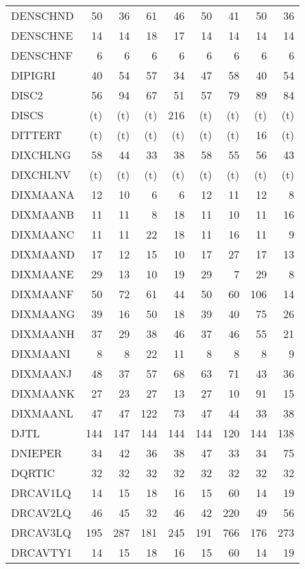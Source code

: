 \documentclass[11pt,twoside]{article}
\begin{document}
{\begin{longtable}[c]{|l|r|r|r|r|r|r|r|r|}
 DENSCHND & 50 & 36 & 61 & 46 & 50 & 41 & 50 & 36 \\
 DENSCHNE & 14 & 14 & 18 & 17 & 14 & 14 & 14 & 14 \\
 DENSCHNF & 6 & 6 & 6 & 6 & 6 & 6 & 6 & 6 \\
 DIPIGRI & 40 & 54 & 57 & 34 & 47 & 58 & 40 & 54 \\
 DISC2 & 56 & 94 & 67 & 51 & 57 & 79 & 89 & 84 \\
 DISCS & (t) & (t) & (t) & 216 & (t) & (t) & (t) & (t) \\
 DITTERT & (t) & (t) & (t) & (t) & (t) & (t) & 16 & (t) \\
 DIXCHLNG & 58 & 44 & 33 & 38 & 58 & 55 & 56 & 43 \\
 DIXCHLNV & (t) & (t) & (t) & (t) & (t) & (t) & (t) & (t) \\
 DIXMAANA & 12 & 10 & 6 & 6 & 12 & 11 & 12 & 8 \\
 DIXMAANB & 11 & 11 & 8 & 18 & 11 & 10 & 11 & 16 \\
 DIXMAANC & 11 & 11 & 22 & 18 & 11 & 16 & 11 & 9 \\
 DIXMAAND & 17 & 12 & 15 & 10 & 17 & 27 & 17 & 13 \\
 DIXMAANE & 29 & 13 & 10 & 19 & 29 & 7 & 29 & 8 \\
 DIXMAANF & 50 & 72 & 61 & 44 & 50 & 60 & 106 & 14 \\
 DIXMAANG & 39 & 16 & 50 & 18 & 39 & 40 & 75 & 26 \\
 DIXMAANH & 37 & 29 & 38 & 46 & 37 & 46 & 55 & 21 \\
 DIXMAANI & 8 & 8 & 22 & 11 & 8 & 8 & 8 & 9 \\
 DIXMAANJ & 48 & 37 & 57 & 68 & 63 & 71 & 43 & 36 \\
 DIXMAANK & 27 & 23 & 27 & 13 & 27 & 10 & 91 & 15 \\
 DIXMAANL & 47 & 47 & 122 & 73 & 47 & 44 & 33 & 38 \\
 DJTL & 144 & 147 & 144 & 144 & 144 & 120 & 144 & 138 \\
 DNIEPER & 34 & 42 & 36 & 38 & 47 & 33 & 34 & 75 \\
 DQRTIC & 32 & 32 & 32 & 32 & 32 & 32 & 32 & 32 \\
 DRCAV1LQ & 14 & 15 & 18 & 16 & 15 & 60 & 14 & 19 \\
 DRCAV2LQ & 46 & 45 & 32 & 46 & 42 & 220 & 49 & 56 \\
 DRCAV3LQ & 195 & 287 & 181 & 245 & 191 & 766 & 176 & 273 \\
 DRCAVTY1 & 14 & 15 & 18 & 16 & 15 & 60 & 14 & 19 \\

\end{longtable}}
\end{document}
